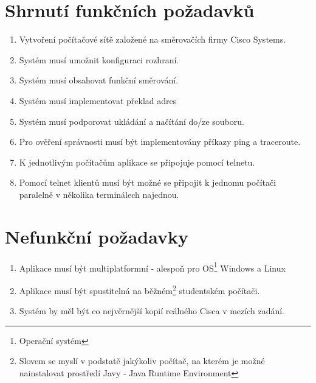 \section{Shrnutí funkčních požadavků}
\begin{enumerate}
 \item Vytvoření počítačové sítě založené na směrovačích firmy Cisco Systems.
 \item Systém musí umožnit konfiguraci rozhraní.
 \item Systém musí obsahovat funkční směrování.
 \item Systém musí implementovat překlad adres
 \item Systém musí podporovat ukládání a načítání do/ze souboru.
 \item Pro ověření správnosti musí být implementovány příkazy ping a traceroute.
 \item K jednotlivým počítačům aplikace se připojuje pomocí telnetu.
 \item Pomocí telnet klientů musí být možné se připojit k jednomu počítači paralelně v několika terminálech najednou.

\end{enumerate}


\section{Nefunkční požadavky}
\begin{enumerate}
 \item Aplikace musí být multiplatformní - alespoň pro OS\footnote{Operační systém} Windows a Linux
 \item Aplikace musí být spustitelná na běžném\footnote{Slovem  se myslí v podstatě jakýkoliv počítač, na kterém je možné nainstalovat prostředí Javy - Java Runtime Environment} studentském počítači.
 \item Systém by měl být co nejvěrnější kopií reálného Cisca v mezích zadání.
\end{enumerate}


